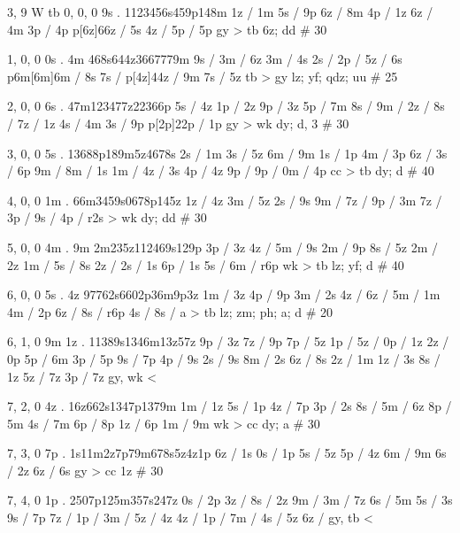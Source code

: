 3, 9
W
tb
0, 0, 0
9s . 
1123456s459p148m
1z / 1m 
5s / 9p 
6z / 8m 
4p / 1z 
6z / 4m 
3p / 4p 
p[6z]66z / 5s 
4z / 
5p / 5p
gy > tb 
6z; dd # 30 

1, 0, 0
0s . 4m 
468s644z3667779m 
9s / 
3m / 6z 
3m / 4s 
2s / 
2p / 
5z / 6s 
p6m[6m]6m / 8s 
7s / 
p[4z]44z / 9m 
7s / 5z 
tb > gy 
lz; yf; qdz; uu # 25

2, 0, 0 
6s .
47m123477z22366p 
5s / 4z 
1p / 2z 
9p / 3z 
5p / 7m 
8s / 
9m / 
2z / 
8s / 
7z / 1z 
4s / 4m 
3s / 9p 
p[2p]22p / 1p 
gy > wk
dy; d, 3 # 30

3, 0, 0
5s .
13688p189m5z4678s 
2s / 1m 
3s / 5z 
6m / 9m 
1s / 1p 
4m / 3p 
6z / 
3s / 6p 
9m / 
8m / 1s 
1m / 
4z / 3s 
4p / 4z 
9p / 
9p / 
0m / 4p 
cc > tb 
dy; d # 40 

4, 0, 0 
1m . 
66m3459s0678p145z 
1z / 4z 
3m / 5z 
2s / 9s 
9m / 
7z / 
9p / 3m 
7z / 
3p / 
9s / 
4p / r2s 
> wk 
dy; dd # 30 

5, 0, 0 
4m . 9m 
2m235z112469s129p 
3p / 3z 
4z / 
5m / 9s 
2m / 9p 
8s / 5z 
2m / 2z 
1m / 
5s / 8s 
2z / 
2s / 1s 
6p / 1s 
5s / 
6m / r6p 
wk > tb 
lz; yf; d # 40 

6, 0, 0
5s . 4z 
97762s6602p36m9p3z 
1m / 3z 
4p / 9p 
3m / 2s 
4z / 
6z / 
5m / 1m 
4m / 2p 
6z / 
8s / r6p 
4s / 
8s / a
> tb 
lz; zm; ph; a; d # 20 

6, 1, 0 
9m 1z . 
11389s1346m13z57z 
9p / 3z 
7z / 9p 
7p / 5z 
1p / 
5z / 
0p / 1z 
2z / 0p 
5p / 6m 
3p / 5p 
9s / 7p 
4p / 9s 
2s / 9s 
8m / 2s 
6z / 8s 
2z / 1m 
1z / 3s 
8s / 1z 
5z / 7z 
3p / 7z 
gy, wk < 

7, 2, 0
4z . 
16z662s1347p1379m 
1m / 1z 
5s / 1p 
4z / 7p 
3p / 2s 
8s / 
5m / 6z 
8p / 5m 
4s / 7m 
6p / 8p 
1z / 6p 
1m / 9m 
wk > cc 
dy; a # 30 

7, 3, 0 
7p . 
1s11m2z7p79m678s5z4z1p 
6z / 1s 
0s / 1p 
5s / 5z 
5p / 4z
6m / 9m 
6s / 2z 
6z / 6s 
gy > cc 
1z # 30 

7, 4, 0 
1p . 
2507p125m357s247z 
0s / 2p 
3z / 
8s / 2z 
9m / 
3m / 7z 
6s / 5m 
5s / 3s 
9s / 7p 
7z / 
1p / 
3m / 
5z / 4z 
4z / 
1p / 
7m / 
4s / 5z 
6z / 
gy, tb <
